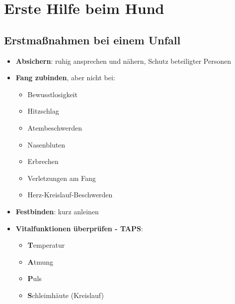 \chapter{Erste Hilfe beim Hund}


\section{Erstmaßnahmen bei einem Unfall}
    \begin{itemize}
        \item \textbf{Absichern}: ruhig ansprechen und nähern, Schutz beteiligter Personen
        \item \textbf{Fang zubinden}, aber nicht bei:
        \begin{itemize}
             \item Bewusstlosigkeit
             \item Hitzschlag
             \item Atembeschwerden
             \item Nasenbluten
             \item Erbrechen
             \item Verletzungen am Fang
             \item Herz-Kreislauf-Beschwerden
         \end{itemize}
        \item \textbf{Festbinden}: kurz anleinen
        \item \textbf{Vitalfunktionen überprüfen - TAPS}:
        \begin{itemize}
            \item \textbf{T}emperatur
            \item \textbf{A}tmung
            \item \textbf{P}uls
            \item \textbf{S}chleimhäute (Kreislauf)
        \end{itemize}
    \end{itemize}

